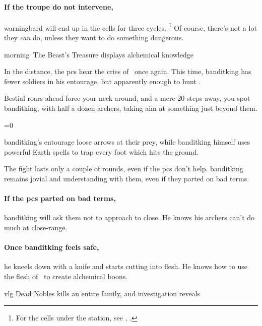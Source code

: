 \paragraph{If the troupe do not intervene,}
\gls{warningbard} will end up in the cells for three \glspl{cycle}.
\footnote{For the cells under the  station, see , .}
Of course, there's not a lot they \emph{can} do, unless they want to do something dangerous.

\warningbard[\label{warningbard}]

{\gls{morning}~The Beast's Treasure}%
{ displays alchemical knowledge}%

In the distance, the \glspl{pc} hear the cries of \localMonster\ once again.
This time, \gls{banditking} has fewer soldiers in his entourage, but apparently enough to hunt \localMonster.

\begin{boxtext}
  Bestial roars ahead force your neck around, and a mere 20 \glspl{step} away, you spot \gls{banditking}, with half a dozen archers, taking aim at something just beyond them.
\end{boxtext}

\ifnum\value{temperature}=0
  \griffin
\else
  \basilisk
\fi

\Gls{banditking}'s entourage loose arrows at their prey, while \gls{banditking} himself uses powerful Earth \glspl{spell} to trap every foot which hits the ground.

The fight lasts only a couple of rounds, even if the \glspl{pc} don't help.
\Gls{banditking} remains jovial and understanding with them, even if they parted on bad terms.

\paragraph{If the \glspl{pc} parted on bad terms,}
\gls{banditking} will ask them not to approach to close.
He knows his archers can't do much at close-range.

\paragraph{Once \gls{banditking} feels safe,}
he kneels down with a knife and starts cutting into flesh.
He knows how to use the flesh of \localMonster\ to create alchemical \glspl{boon}.

{\gls{vlg} Dead Nobles}%
{ kills an entire  family, and investigation reveals }%

